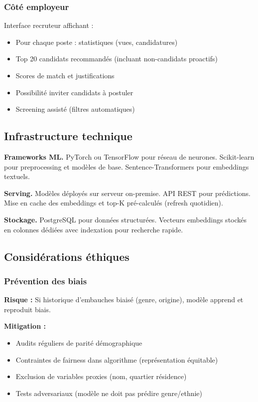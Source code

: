 \documentclass[12pt]{article}
\begin{document}
\subsubsection{Côté employeur}

Interface recruteur affichant :
\begin{itemize}
    \item Pour chaque poste : statistiques (vues, candidatures)
    \item Top 20 candidats recommandés (incluant non-candidats proactifs)
    \item Scores de match et justifications
    \item Possibilité inviter candidats à postuler
    \item Screening assisté (filtres automatiques)
\end{itemize}

\subsection{Infrastructure technique}

\textbf{Frameworks ML.} PyTorch ou TensorFlow pour réseau de neurones. Scikit-learn pour preprocessing et modèles de base. Sentence-Transformers pour embeddings textuels.

\textbf{Serving.} Modèles déployés sur serveur on-premise. API REST pour prédictions. Mise en cache des embeddings et top-K pré-calculés (refresh quotidien).

\textbf{Stockage.} PostgreSQL pour données structurées. Vecteurs embeddings stockés en colonnes dédiées avec indexation pour recherche rapide.

\subsection{Considérations éthiques}

\subsubsection{Prévention des biais}

\textbf{Risque :} Si historique d'embauches biaisé (genre, origine), modèle apprend et reproduit biais.

\textbf{Mitigation :}
\begin{itemize}
    \item Audits réguliers de parité démographique
    \item Contraintes de fairness dans algorithme (représentation équitable)
    \item Exclusion de variables proxies (nom, quartier résidence)
    \item Tests adversariaux (modèle ne doit pas prédire genre/ethnie)
\end{itemize}
\end{document}
